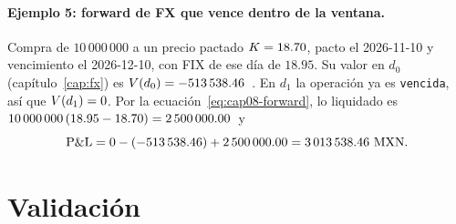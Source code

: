 \paragraph{Ejemplo 5: forward de FX que vence dentro de la ventana.} Compra de $10\,000\,000$ \USD a un precio pactado $\K = 18.70$, pacto el 2026-11-10 y vencimiento el 2026-12-10, con FIX de ese día de $18.95$. Su valor en $d_0$ (capítulo~\ref{cap:fx}) es $\PV(d_0) = \verif{cap08-pv-fwd}{-513538.46}$~\MXN. En $d_1$ la operación ya es \texttt{vencida}, así que $\PV(d_1) = 0$. Por la ecuación~\eqref{eq:cap08-forward}, lo liquidado es $10\,000\,000\,(18.95 - 18.70) = \verif{cap08-liquidado-fwd}{2500000.00}$~\MXN y
\[
  \PnL = 0 - (-513\,538.46) + 2\,500\,000.00 = \verif{cap08-pnl-fwd}{3013538.46}~\MXN.
\]

\section{Validación}\label{sec:cap08-validacion}

